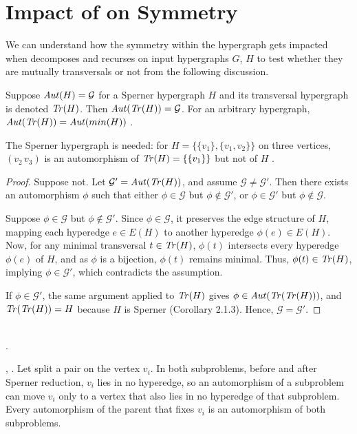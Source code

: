 \section{Impact of \FKA{} on Symmetry}

We can understand how the symmetry within the hypergraph gets impacted when \FKA{} decomposes and recurses on input hypergraphs $G$, $H$ to test whether they are mutually transversals or not from the following discussion.

\begin{lemma}\label{lem:aut-tr}
Suppose $\mathit{Aut}(H)=\mathcal{G}$ for a Sperner hypergraph $H$ and its transversal hypergraph is denoted $\mathit{Tr}(H)$. Then $\mathit{Aut}(\mathit{Tr}(H))=\mathcal{G}$. For an arbitrary hypergraph, $\mathit{Aut}(\mathit{Tr}(H))=\mathit{Aut}(min(H))$ .
\end{lemma}

The Sperner hypergraph is needed: for $H=\{\{v_1\},\{v_1,v_2\}\}$ on three vertices, $(v_2\,v_3)$ is an automorphism of $\mathit{Tr}(H)=\{\{v_1\}\}$ but not of $H$ .

\begin{proof}
Suppose not. Let $\mathcal{G}'=\mathit{Aut}(\mathit{Tr}(H))$, and assume $\mathcal{G}\neq\mathcal{G}'$. Then there exists an automorphism $\phi$ such that either $\phi\in\mathcal{G}$ but $\phi\notin\mathcal{G}'$, or $\phi\in\mathcal{G}'$ but $\phi\notin\mathcal{G}$.

Suppose $\phi\in\mathcal{G}$ but $\phi\notin\mathcal{G}'$. Since $\phi\in\mathcal{G}$, it preserves the edge structure of $H$, mapping each hyperedge $e\in E(H)$ to another hyperedge $\phi(e)\in E(H)$. Now, for any minimal transversal $t\in\mathit{Tr}(H)$, $\phi(t)$ intersects every hyperedge $\phi(e)$ of $H$, and as $\phi$ is a bijection, $\phi(t)$ remains minimal. Thus, $\phi(t)\in\mathit{Tr}(H)$, implying $\phi\in\mathcal{G}'$, which contradicts the assumption.

If $\phi\in\mathcal{G}'$, the same argument applied to $\mathit{Tr}(H)$ gives $\phi\in\mathit{Aut}(\mathit{Tr}(\mathit{Tr}(H)))$, and $\mathit{Tr}(\mathit{Tr}(H))=H$ because $H$ is Sperner (Corollary 2.1.3). Hence, $\mathcal{G}=\mathcal{G}'$.
\end{proof}

\begin{lemma}
\leavevmode\\
.
\par{}, .
\label{lem:break}
Let \FKA{} split a pair on the vertex $v_i$. In both subproblems, before and after Sperner reduction, $v_i$ lies in no hyperedge, so an automorphism of a subproblem can move $v_i$ only to a vertex that also lies in no hyperedge of that subproblem. Every automorphism of the parent that fixes $v_i$ is an automorphism of both subproblems.
\end{lemma}

